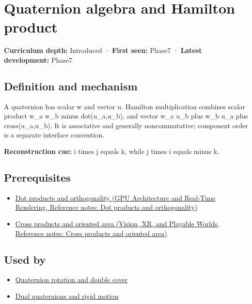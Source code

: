 \hypertarget{appendix-965d9260eeab}{}\label{referencestart:appendix-965d9260eeab}
\section{Quaternion algebra and Hamilton product}\label{appendix-965d9260eeab-quaternion-algebra-and-hamilton-product}

\textbf{Curriculum depth:} Introduced · \textbf{First seen:} Phase7 · \textbf{Latest development:} Phase7

\subsection{Definition and mechanism}\label{appendix-965d9260eeab-definition-and-mechanism}

A quaternion has scalar w and vector u. Hamilton multiplication combines scalar product w\_a w\_b minus dot(u\_a,u\_b), and vector w\_a u\_b plus w\_b u\_a plus cross(u\_a,u\_b). It is associative and generally noncommutative; component order is a separate interface convention.

\textbf{Reconstruction cue:} i times j equals k, while j times i equals minus k.

\subsection{Prerequisites}\label{appendix-965d9260eeab-prerequisites}

\begin{itemize}
\tightlist
\item
  \href{../06-GPU-Architecture-and-Real-Time-Rendering/main.pdf\#nameddest=appendix-8bc4e8fc547c}{Dot products and orthogonality (GPU Architecture and Real-Time Rendering, Reference notes: Dot products and orthogonality)}
\item
  \href{../07-Vision-XR-and-Playable-Worlds/main.pdf\#nameddest=appendix-2391db8052b1}{Cross products and oriented area (Vision, XR, and Playable Worlds, Reference notes: Cross products and oriented area)}
\end{itemize}

\subsection{Used by}\label{appendix-965d9260eeab-used-by}

\begin{itemize}
\tightlist
\item
  \hyperref[appendix-8e61ab68f6b2]{Quaternion rotation and double cover}
\item
  \hyperref[appendix-d1ea57347893]{Dual quaternions and rigid motion}
\end{itemize}

